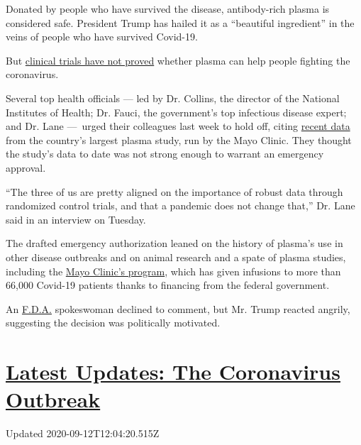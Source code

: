 Donated by people who have survived the disease, antibody-rich plasma is
considered safe. President Trump has hailed it as a ``beautiful
ingredient'' in the veins of people who have survived Covid-19.

But
\href{https://www.nytimes3xbfgragh.onion/2020/08/04/health/trump-plasma.html}{clinical
trials have not proved} whether plasma can help people fighting the
coronavirus.

Several top health officials --- led by Dr. Collins, the director of the
National Institutes of Health; Dr. Fauci, the government's top
infectious disease expert; and Dr. Lane ---~urged their colleagues last
week to hold off, citing
\href{https://www.medrxiv.org/content/10.1101/2020.08.12.20169359v1}{recent
data} from the country's largest plasma study, run by the Mayo Clinic.
They thought the study's data to date was not strong enough to warrant
an emergency approval.

``The three of us are pretty aligned on the importance of robust data
through randomized control trials, and that a pandemic does not change
that,'' Dr. Lane said in an interview on Tuesday.

The drafted emergency authorization leaned on the history of plasma's
use in other disease outbreaks and on animal research and a spate of
plasma studies, including the \href{https://www.uscovidplasma.org/}{Mayo
Clinic's program}, which has given infusions to more than 66,000
Covid-19 patients thanks to financing from the federal government.

An
\href{https://www.nytimes3xbfgragh.onion/2020/08/28/health/blood-plasma-fda.html}{F.D.A.}
spokeswoman declined to comment, but Mr. Trump reacted angrily,
suggesting the decision was politically motivated.

\hypertarget{latest-updates-the-coronavirus-outbreak}{%
\section{\texorpdfstring{\href{https://www.nytimes3xbfgragh.onion/2020/09/11/world/covid-19-coronavirus.html?action=click\&pgtype=Article\&state=default\&region=MAIN_CONTENT_1\&context=storylines_live_updates}{Latest
Updates: The Coronavirus
Outbreak}}{Latest Updates: The Coronavirus Outbreak}}\label{latest-updates-the-coronavirus-outbreak}}

Updated 2020-09-12T12:04:20.515Z

